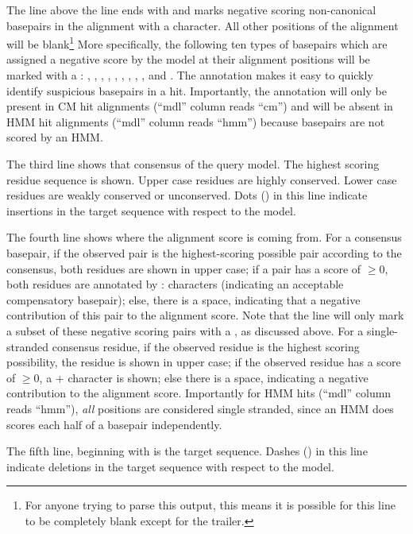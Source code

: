 The line above the  line ends with  and marks
negative scoring non-canonical basepairs in the alignment with a
 character. All other positions of the alignment will be
blank\footnote{For anyone trying to parse this output, this means it
is possible for this line to be completely blank except for the
 trailer.} More specifically, the following ten types of
basepairs which are assigned a negative score by the model at their
alignment positions will be marked with a : ,
, , , , ,
, , , and . The 
annotation makes it easy to quickly identify suspicious basepairs in
a hit. Importantly, the  annotation will only be present in
CM hit alignments (``mdl'' column reads ``cm'') and will be absent in
HMM hit alignments (``mdl'' column reads ``hmm'') because basepairs
are not scored by an HMM.

The third line shows that consensus of the query model. The highest
scoring residue sequence is shown. Upper case residues are highly
conserved. Lower case residues are weakly conserved or unconserved.
Dots () in this line indicate insertions in the target
sequence with respect to the model.

The fourth line shows where the alignment score is coming from. For a
consensus basepair, if the observed pair is the highest-scoring
possible pair according to the consensus, both residues are shown in
upper case; if a pair has a score of $\geq 0$, both residues are
annotated by : characters (indicating an acceptable compensatory
basepair); else, there is a space, indicating that a negative
contribution of this pair to the alignment score. Note that the 
 line will only mark a subset of these negative scoring
pairs with a , as discussed above.
For a single-stranded consensus residue, if the observed residue is
the highest scoring possibility, the residue is shown in upper case;
if the observed residue has a score of $\geq 0$, a \verb+++ character
is shown; else there is a space, indicating a negative contribution to
the alignment score. Importantly for HMM hits (``mdl'' column reads
``hmm''), \emph{all} positions are considered single stranded, since
an HMM does scores each half of a basepair independently.

The fifth line, beginning with  is
the target sequence. Dashes (\prog{-}) in this line indicate deletions
in the target sequence with respect to the model.

